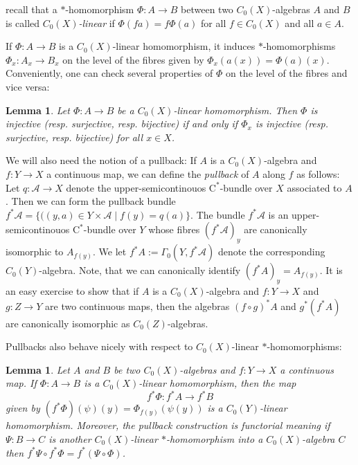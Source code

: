 \documentclass[reqno,oneside,a4paper,11pt]{amsart}
\theoremstyle{theorem}
\newtheorem{lemma}[satz]{Lemma}
\theoremstyle{definition}
\begin{document}
	recall that a $\ast$-homomorphism $\Phi:A\rightarrow B$ between two $C_0(X)$-algebras $A$ and $B$ is called \textit{$C_0(X)$-linear} if $\Phi(f a)=f \Phi(a)$ for all $f\in C_0(X)$ and all $a\in A$.
	
	If $\Phi:A\rightarrow B$ is a $C_0(X)$-linear homomorphism, it induces $\ast$-homo\-morphisms $\Phi_x:A_x\rightarrow B_x$ on the level of the fibres given by $\Phi_x(a(x))=\Phi(a)(x)$.
	Conveniently, one can check several properties of $\Phi$ on the level of the fibres and vice versa:
	\begin{lemma}\cite[Lemma~2.1]{MR2820377}\label{Lem:IsomorphismCriteriumForC(X)-linearHomomorphisms}
		Let $\Phi:A\rightarrow B$ be a $C_0(X)$-linear homomorphism. Then $\Phi$ is injective (resp. surjective, resp. bijective) if and only if $\Phi_x$ is injective (resp. surjective, resp. bijective) for all $x\in X$.
	\end{lemma}
	
	We will also need the notion of a pullback: If $A$ is a $C_0(X)$-algebra and $f:Y\rightarrow X$ a continuous map, we can define the \textit{pullback} of $A$ along $f$ as follows:
	Let $q:\mathcal{A}\rightarrow X$ denote the upper-semicontinouos $\mathrm{C}^*$-bundle over $X$ associated to $A$. Then we can form the pullback bundle $f^*\mathcal{A}=\lbrace ((y,a)\in Y\times\mathcal{A}\mid f(y)=q(a)\rbrace$. The bundle $f^*\mathcal{A}$ is an upper-semicontinouos $\mathrm{C}^*$-bundle over $Y$ whose fibres $(f^*\mathcal{A})_y$ are canonically isomorphic to $A_{f(y)}$. We let $f^*A:=\Gamma_0(Y,f^*\mathcal{A})$ denote the corresponding $C_0(Y)$-algebra. Note, that we can canonically identify $(f^*A)_y=A_{f(y)}$.
	It is an easy exercise to show that if $A$ is a $C_0(X)$-algebra and $f:Y\rightarrow X$ and $g:Z\rightarrow Y$ are two continuous maps, then the algebras $(f\circ g)^*A$ and $g^*(f^*A)$ are canonically isomorphic as $C_0(Z)$-algebras.
	
	Pullbacks also behave nicely with respect to $C_0(X)$-linear $\ast$-homomorphisms:	
	\begin{lemma}\label{Lem:PullbackOfHomomorphisms}
		Let $A$ and $B$ be two $C_0(X)$-algebras and $f:Y\rightarrow X$ a continuous map. If $\Phi:A\rightarrow B$ is a $C_0(X)$-linear homomorphism, then the map
		$$f^*\Phi:f^*A\rightarrow f^*B$$
		given by $(f^*\Phi)(\psi)(y)=\Phi_{f(y)}(\psi(y))$ is a $C_0(Y)$-linear homomorphism.
		Moreover, the pullback construction is functorial meaning if $\Psi:B\rightarrow C$ is another $C_0(X)$-linear $*$-homo\-morphism into a $C_0(X)$-algebra $C$ then $f^*\Psi\circ f^*\Phi=f^*(\Psi\circ \Phi)$.
	\end{lemma}
	
\end{document}
